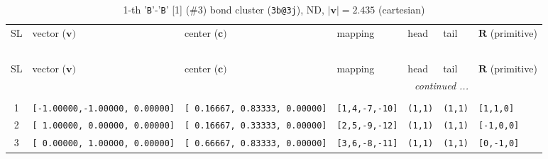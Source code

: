 \documentclass[fleqn,10pt,landscape]{jsarticle}
\begin{document}
\begin{longtable}[l]{cllllll}
\captionsetup{justification=raggedright, singlelinecheck=off}
\caption{1-th '\texttt{B}'-'\texttt{B}' [1] (\#3) bond cluster (\texttt{3b@3j}), ND, $|\bm{v}|=2.435$ (cartesian)}
 \\
 \hline \hline
SL & vector ($\bm{v})$ & center ($\bm{c})$ & mapping & head & tail & $\bm{R}$ (primitive) \\ \hline \endfirsthead

\multicolumn{6}{l}{\tablename\ \thetable{}} \\
 \hline \hline
SL & vector ($\bm{v})$ & center ($\bm{c})$ & mapping & head & tail & $\bm{R}$ (primitive) \\ \hline \endhead

 \hline \hline
\multicolumn{6}{r}{\footnotesize\it continued ...} \\ \endfoot

 \hline \hline
\multicolumn{6}{r}{} \\ \endlastfoot

1 & \texttt{[-1.00000,-1.00000, 0.00000]} & \texttt{[ 0.16667, 0.83333, 0.00000]} & \texttt{[1,4,-7,-10]} & \texttt{(1,1)} & \texttt{(1,1)} & \texttt{[1,1,0]} \\ \hline
2 & \texttt{[ 1.00000, 0.00000, 0.00000]} & \texttt{[ 0.16667, 0.33333, 0.00000]} & \texttt{[2,5,-9,-12]} & \texttt{(1,1)} & \texttt{(1,1)} & \texttt{[-1,0,0]} \\ \hline
3 & \texttt{[ 0.00000, 1.00000, 0.00000]} & \texttt{[ 0.66667, 0.83333, 0.00000]} & \texttt{[3,6,-8,-11]} & \texttt{(1,1)} & \texttt{(1,1)} & \texttt{[0,-1,0]} \\
\end{longtable}
\end{document}
